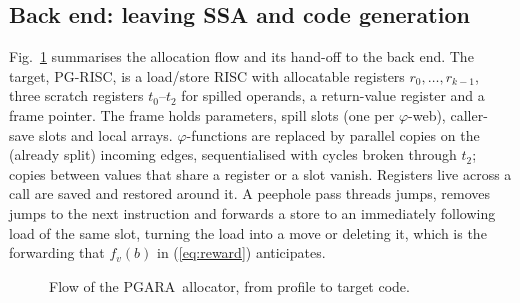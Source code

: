 \documentclass{ieeeaccess}
\newcommand{\MG}{PGARA}
\begin{document}
\subsection{Back end: leaving SSA and code generation}
\label{sec:backend}

Fig.~\ref{fig:allocflow} summarises the allocation flow and its
hand-off to the back end. The target, PG-RISC, is a load/store RISC with
allocatable registers $r_0,\dots,r_{k-1}$, three scratch registers
$t_0$--$t_2$ for spilled operands, a return-value register and a frame
pointer. The frame holds parameters, spill slots (one per $\varphi$-web),
caller-save slots and local arrays. $\varphi$-functions are replaced by
parallel copies on the (already split) incoming edges, sequentialised
with cycles broken through $t_2$; copies between values that share a
register or a slot vanish. Registers live across a call are saved and
restored around it. A peephole pass threads jumps, removes jumps to the
next instruction and forwards a store to an immediately following load
of the same slot, turning the load into a move or deleting it, which
is the forwarding that $f_v(b)$ in (\ref{eq:reward}) anticipates.

\begin{figure}[t]
\centering
{}
\caption{Flow of the \MG\ allocator, from profile to target code.}
\label{fig:allocflow}
\end{figure}
\end{document}
